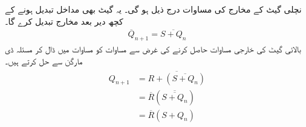  نچلی گیٹ  کے مخارج کی مساوات درج ذیل ہو گی۔ یہ گیٹ بھی مداخل تبدیل ہونے کے کچھ دیر بعد مخارج تبدیل کرے گا۔
 \begin{align}\label{مساوات_ترتیبی_اگلا_متمم_کیو}
 \overline{Q}_{n+1}=\overline{S+Q_n}
 \end{align}
بالائی گیٹ کی خارجی مساوات حاصل کرنے کی غرض سے مساوات  کو مساوات  میں ڈال کر مسئلہ ڈی مارگن سے حل کرتے ہیں۔
\begin{gather}
\begin{aligned}\label{مساوات_ترتیبی_اگلا_کیو_حل}
Q_{n+1}&=\overline{R+(\overline{S+Q_n})}\\
&=\overline{R}(\overline{\overline{S+Q_n}})\\
&=\overline{R}(S+Q_n)
\end{aligned}
\end{gather}


